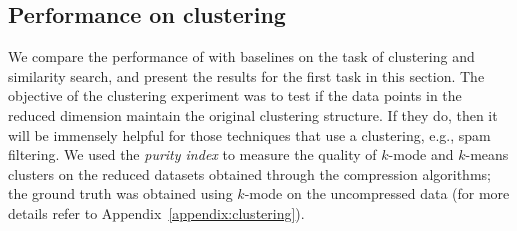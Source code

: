 \begin{table}[t]
{
\caption{{%
Speedup from running tasks on 1000-dimensional sketches instead of the full
    dimensional dataset. We got a DNS error while running clustering on the uncompressed BrainCell dataset. 
    } }\label{tab:speed_up_task_time}
 \centering
{}
  
  }
\end{table}

\subsection{Performance on clustering}
We compare the performance of \fsketch with baselines on the task of clustering and similarity search, and present the results for the first task in this section. The objective of the clustering experiment 
was to test if the data points in the reduced dimension maintain the original clustering structure. If they do, then it will be immensely helpful for those techniques that use a clustering, e.g., spam filtering. We used the {\it purity index} to measure the quality of $k$-mode and $k$-means clusters on the reduced datasets obtained through the compression algorithms; the ground truth was obtained using $k$-mode on the uncompressed data (for more details refer to Appendix~\ref{appendix:clustering}).

